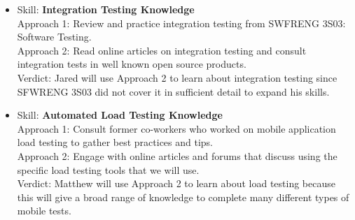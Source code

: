 \documentclass[12pt, titlepage]{article}
\begin{document}
\begin{enumerate}
\begin{itemize}
			\item Skill: \textbf{Integration Testing Knowledge}
			\\Approach 1: Review and practice integration testing from SWFRENG 3S03: Software Testing.
			\\Approach 2: Read online articles on integration testing and consult integration tests in well known open source products.
			\\Verdict: Jared will use Approach 2 to learn about integration testing since SFWRENG 3S03 did not cover it in sufficient detail to expand his skills.

			\item Skill: \textbf{Automated Load Testing Knowledge}
			\\Approach 1: Consult former co-workers who worked on mobile application load testing to gather best practices and tips.
			\\Approach 2: Engage with online articles and forums that discuss using the specific load testing tools that we will use.
			\\Verdict: Matthew will use Approach 2 to learn about load testing because this will give a broad range of knowledge to complete many different types of mobile tests.
			
		\end{itemize}

	\end{enumerate}
		
	
\end{document}
